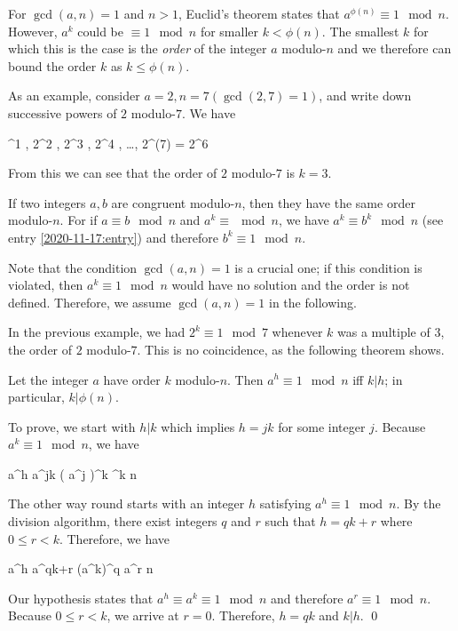 
For $\gcd(a,n)=1$ and $n > 1$, Euclid's theorem states that $a^{\phi(n)} \equiv 1 \mod n$. However, $a^k$ could be $\equiv 1 \mod n$ for smaller $k < \phi(n)$. The smallest $k$ for which this is the case is the \emph{order} of the integer $a$ modulo-$n$ and we therefore can bound the order $k$ as $k \leq \phi(n)$.

As an example, consider $a = 2, n = 7 (\gcd(2,7)=1)$, and write down successive powers of $2$ modulo-$7$. We have

^1  , 2^2  , 2^3  , 2^4  , \ldots, 2^{\phi(7)} = 2^6  
\eee

From this we can see that the order of $2$ modulo-$7$ is $k=3$.

If two integers $a, b$ are congruent modulo-$n$, then they have the same order modulo-$n$. For if $a \equiv b \mod n$ and $a^k \equiv \mod n$, we have $a^k \equiv b^k \mod n$ (see entry \ref{2020-11-17:entry}) and therefore $b^k \equiv 1 \mod n$.

Note that the condition $\gcd(a,n)=1$ is a crucial one; if this condition is violated, then $a^k \equiv 1 \mod n$ would have no solution and the order is not defined. Therefore, we assume $\gcd(a,n)=1$ in the following.

In the previous example, we had $2^k \equiv 1 \mod 7$ whenever $k$ was a multiple of $3$, the order of $2$ modulo-$7$. This is no coincidence, as the following theorem shows.

\begin{theorem}
  Let the integer $a$ have order $k$ modulo-$n$. Then $a^h \equiv 1 \mod n$ iff $k | h$; in particular, $k | \phi(n)$.
\end{theorem}

To prove, we start with $h | k$ which implies $h = jk$ for some integer $j$. Because $a^k \equiv 1 \mod n$, we have

\bee
a^h \equiv a^{jk} \equiv \left( a^j \right)^k ^k  \mod n
\eee

The other way round starts with an integer $h$ satisfying $a^h \equiv 1 \mod n$. By the division algorithm, there exist integers $q$ and $r$ such that $h = qk+r$ where $0 \leq r < k$. Therefore, we have

\bee
a^h \equiv a^{qk+r} \equiv \left(a^k\right)^q a^r \mod n
\eee

Our hypothesis states that $a^h \equiv a^k \equiv 1 \mod n$ and therefore $a^r \equiv 1 \mod n$. Because $0 \leq r < k$, we arrive at $r=0$. Therefore, $h = qk$ and $k | h$. \qed

